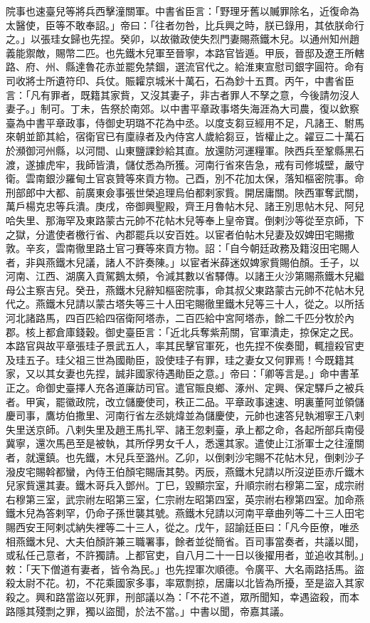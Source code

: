 \begin{pinyinscope}
院事也速臺兒等將兵西擊潼關軍。中書省臣言：「野理牙舊以贓罪除名，近復命為太醫使，臣等不敢奉詔。」帝曰：「往者勿咎，比兵興之時，朕已錄用，其依朕命行之。」以張珪女歸也先捏。癸卯，以故徽政使失烈門妻賜燕鐵木兒。以通州知州趙義能禦敵，賜幣二匹。也先鐵木兒軍至晉寧，本路官皆遁。甲辰，晉邸及遼王所轄路、府、州、縣達魯花赤並罷免禁錮，選流官代之。給淮東宣慰司銀字圓符。命有司收將士所遺符印、兵仗。賑糶京城米十萬石，石為鈔十五貫。丙午，中書省臣言：「凡有罪者，既籍其家貲，又沒其妻子，非古者罪人不孥之意，今後請勿沒人妻子。」制可。丁未，告祭於南郊。以中書平章政事塔失海涯為大司農，復以欽察臺為中書平章政事，侍御史玥璐不花為中丞。以度支芻豆經用不足，凡諸王、駙馬來朝並節其給，宿衛官已有廩祿者及內侍宮人歲給芻豆，皆權止之。糴豆二十萬石於瀕御河州縣，以河間、山東鹽課鈔給其直。放還防河運糧軍。陜西兵至鞏縣黑石渡，遂據虎牢，我師皆潰，儲仗悉為所獲。河南行省來告急，戒有司修城壁，嚴守衛。雲南銀沙羅甸土官哀贊等來貢方物。己酉，別不花加太保，落知樞密院事。命刑部郎中大都、前廣東僉事張世榮追理烏伯都剌家貲。開居庸關。陜西軍奪武關，萬戶楊克忠等兵潰。庚戌，帝御興聖殿，齊王月魯帖木兒、諸王別思帖木兒、阿兒哈失里、那海罕及東路蒙古元帥不花帖木兒等奉上皇帝寶。倒剌沙等從至京師，下之獄，分遣使者檄行省、內郡罷兵以安百姓。以宦者伯帖木兒妻及奴婢田宅賜撒敦。辛亥，雲南徹里路土官刁賽等來貢方物。詔：「自今朝廷政務及籍沒田宅賜人者，非與燕鐵木兒議，諸人不許奏陳。」以宦者米薛迷奴婢家貲賜伯顏。壬子，以河南、江西、湖廣入貢駕鵝太頻，令減其數以省驛傳。以諸王火沙第賜燕鐵木兒繼母公主察吉兒。癸丑，燕鐵木兒辭知樞密院事，命其叔父東路蒙古元帥不花帖木兒代之。燕鐵木兒請以蒙古塔失等三十人田宅賜徹里鐵木兒等三十人，從之。以所括河北諸路馬，四百匹給四宿衛阿塔赤，二百匹給中宮阿塔赤，餘二千匹分牧於內郡。核上都倉庫錢穀。御史臺臣言：「近北兵奪紫荊關，官軍潰走，掠保定之民。本路官與故平章張珪子景武五人，率其民擊官軍死，也先捏不俟奏聞，輒擅殺官吏及珪五子。珪父祖三世為國勛臣，設使珪子有罪，珪之妻女又何罪焉！今既籍其家，又以其女妻也先捏，誠非國家待遇勛臣之意。」帝曰：「卿等言是。」命中書革正之。命御史臺擇人充各道廉訪司官。遣官賑良鄉、涿州、定興、保定驛戶之被兵者。甲寅，罷徽政院，改立儲慶使司，秩正二品。平章政事速速、明裏董阿並領儲慶司事，鷹坊伯撒里、河南行省左丞姚煒並為儲慶使，元帥也速答兒執湘寧王八剌失里送京師。八剌失里及趙王馬扎罕、諸王忽剌臺，承上都之命，各起所部兵南侵冀寧，還次馬邑至是被執，其所俘男女千人，悉還其家。遣使止江浙軍士之往潼關者，就還鎮。也先鐵，木兒兵至潞州。乙卯，以倒剌沙宅賜不花帖木兒，倒剌沙子潑皮宅賜斡都蠻，內侍王伯顏宅賜唐其勢。丙辰，燕鐵木兒請以所沒逆臣赤斤鐵木兒家貲還其妻。鐵木哥兵入鄧州。丁巳，毀顯宗室，升順宗祔右穆第二室，成宗祔右穆第三室，武宗祔左昭第三室，仁宗祔左昭第四室，英宗祔右穆第四室。加命燕鐵木兒為答剌罕，仍命子孫世襲其號。燕鐵木兒請以河南平章曲列等二十三人田宅賜西安王阿剌忒納失裡等二十三人，從之。戊午，詔諭廷臣曰：「凡今臣僚，唯丞相燕鐵木兒、大夫伯顏許兼三職署事，餘者並從簡省。百司事當奏者，共議以聞，或私任己意者，不許獨請。上都官吏，自八月二十一日以後擢用者，並追收其制。」敕：「天下僧道有妻者，皆令為民。」也先捏軍次順德。令廣平、大名兩路括馬。盜殺太尉不花。初，不花乘國家多事，率眾剽掠，居庸以北皆為所擾，至是盜入其家殺之。興和路當盜以死罪，刑部議以為：「不花不道，眾所聞知，幸遇盜殺，而本路隱其殘剽之罪，獨以盜聞，於法不當。」中書以聞，帝嘉其議。




\end{pinyinscope}
